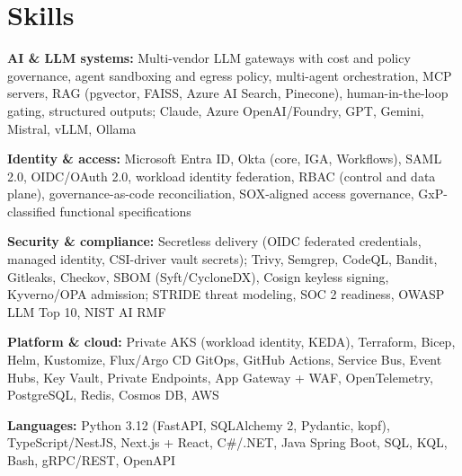 \documentclass[10pt,letterpaper]{article}
\newcommand{\szmeta}{\fontsize{8pt}{10pt}\selectfont}
\begin{document}
\section*{Skills}
{\szmeta \textbf{AI \& LLM systems:} Multi-vendor LLM gateways with cost and policy governance, agent sandboxing and egress policy, multi-agent orchestration, MCP servers, RAG (pgvector, FAISS, Azure AI Search, Pinecone), human-in-the-loop gating, structured outputs; Claude, Azure OpenAI/Foundry, GPT, Gemini, Mistral, vLLM, Ollama\par\vspace{2pt}\textbf{Identity \& access:} Microsoft Entra ID, Okta (core, IGA, Workflows), SAML 2.0, OIDC/OAuth 2.0, workload identity federation, RBAC (control and data plane), governance-as-code reconciliation, SOX-aligned access governance, GxP-classified functional specifications\par\vspace{2pt}\textbf{Security \& compliance:} Secretless delivery (OIDC federated credentials, managed identity, CSI-driver vault secrets); Trivy, Semgrep, CodeQL, Bandit, Gitleaks, Checkov, SBOM (Syft/CycloneDX), Cosign keyless signing, Kyverno/OPA admission; STRIDE threat modeling, SOC 2 readiness, OWASP LLM Top 10, NIST AI RMF\par\vspace{2pt}\textbf{Platform \& cloud:} Private AKS (workload identity, KEDA), Terraform, Bicep, Helm, Kustomize, Flux/Argo CD GitOps, GitHub Actions, Service Bus, Event Hubs, Key Vault, Private Endpoints, App Gateway + WAF, OpenTelemetry, PostgreSQL, Redis, Cosmos DB, AWS\par\vspace{2pt}\textbf{Languages:} Python 3.12 (FastAPI, SQLAlchemy 2, Pydantic, kopf), TypeScript/NestJS, Next.js + React, C\#/.NET, Java Spring Boot, SQL, KQL, Bash, gRPC/REST, OpenAPI}\par
\end{document}
